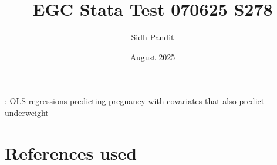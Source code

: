 \documentclass[12pt]{article}
\title{EGC Stata Test 070625 S278}
\author{Sidh Pandit}
\date{August 2025}
\begin{document}
\maketitle

\begin{table}[H]
    \centering
    \scriptsize %
    \caption{: OLS regressions predicting pregnancy with covariates that also predict underweight}
    \setlength{\tabcolsep}{1pt}
    \renewcommand{\arraystretch}{0.81}
    {}
\end{table}



\section{References used}
\end{document}
